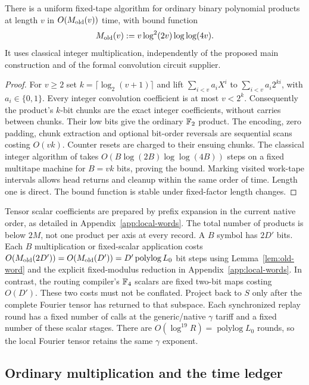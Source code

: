 \begin{lemma}
\label{lem:old-word}
There is a uniform fixed-tape algorithm for ordinary binary polynomial
products at length $v$ in $O(M_{\rm old}(v))$ time, with bound function
\[
 M_{\rm old}(v):=v\log^2(2v)\log\log(4v).
\]
It uses classical integer multiplication, independently of the proposed
main construction and of the formal convolution circuit supplier.
\end{lemma}
\begin{proof}
For $v\ge2$ set $k=\lceil\log_2(v+1)\rceil$ and lift
$\sum_{i<v}a_iX^i$ to $\sum_{i<v}a_i2^{ki}$, with $a_i\in\{0,1\}$.
Every integer convolution coefficient is at most $v<2^k$.
Consequently the product's $k$-bit chunks are the exact integer
coefficients, without carries between chunks. Their low bits give the
ordinary $\mathbb F_2$ product. The encoding, zero padding, chunk extraction
and optional bit-order reversals are sequential scans costing $O(vk)$.
Counter resets are charged to their ensuing chunks. The classical
integer algorithm of \cite{ss} takes
$O(B\log(2B)\log\log(4B))$ steps on a fixed multitape machine for
$B=vk$ bits, proving the bound. Marking visited work-tape intervals
allows head returns and cleanup within the same order of time.
Length one is direct. The bound function is stable under fixed-factor
length changes.
\end{proof}

Tensor scalar coefficients are prepared by prefix expansion in the
current native order, as detailed in Appendix~\ref{app:local-words}. The total
number of products is below $2M$, not one product per axis at every
record. A $B$
symbol has $2D'$ bits. Each $B$ multiplication or fixed-scalar
application costs $O(M_{\rm old}(2D'))=O(M_{\rm old}(D'))
=D'\operatorname{polylog} L_0$ bit steps using Lemma~\ref{lem:old-word} and the
explicit fixed-modulus reduction in Appendix~\ref{app:local-words}.
In contrast, the routing compiler's $\mathbb F_4$
scalars are fixed two-bit maps costing $O(D')$. These two costs must
not be conflated. Project back to $S$ only after the complete Fourier
tensor has returned to that subspace.
Each synchronized replay round has a fixed number of calls at the
generic/native $\gamma$ tariff and a fixed number of these scalar
stages. There are $O(\log^{19} R)=\operatorname{polylog}L_0$ rounds,
so the local Fourier tensor retains the same $\gamma$ exponent.

\subsection{Ordinary multiplication and the time ledger}

